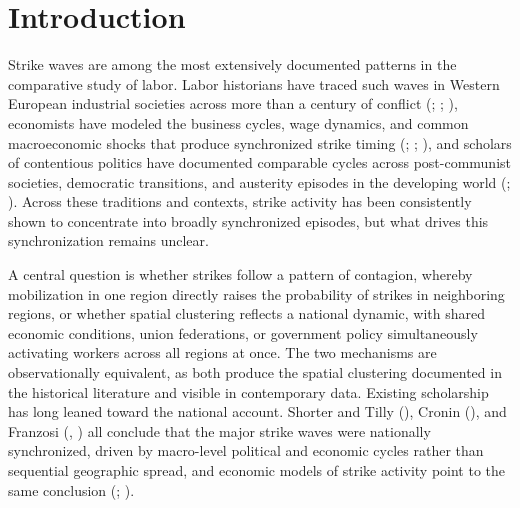 \documentclass[
  11pt,
]{article}
\begin{document}
\vspace{0.25in}



\vspace{0.25in}





\restoregeometry

\section{Introduction}\label{introduction}

Strike waves are among the most extensively documented patterns in the
comparative study of labor. Labor historians have traced such waves in
Western European industrial societies across more than a century of
conflict (;
;
), economists have modeled the
business cycles, wage dynamics, and common macroeconomic shocks that
produce synchronized strike timing
(;
; ), and scholars of contentious politics have documented
comparable cycles across post-communist societies, democratic
transitions, and austerity episodes in the developing world
(;
). Across these traditions
and contexts, strike activity has been consistently shown to concentrate
into broadly synchronized episodes, but what drives this synchronization
remains unclear.

A central question is whether strikes follow a pattern of contagion,
whereby mobilization in one region directly raises the probability of
strikes in neighboring regions, or whether spatial clustering reflects a
national dynamic, with shared economic conditions, union federations, or
government policy simultaneously activating workers across all regions
at once. The two mechanisms are observationally equivalent, as both
produce the spatial clustering documented in the historical literature
and visible in contemporary data. Existing scholarship has long leaned
toward the national account. Shorter and Tilly
(), Cronin
(), and Franzosi
(, )
all conclude that the major strike waves were nationally synchronized,
driven by macro-level political and economic cycles rather than
sequential geographic spread, and economic models of strike activity
point to the same conclusion (; ).
\end{document}
